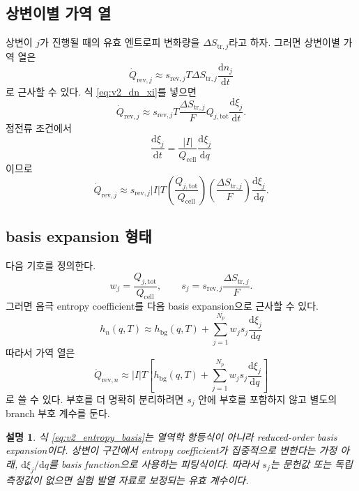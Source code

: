 \documentclass[11pt,a4paper]{article}
\newtheorem*{note}{설명}
\newcommand{\dd}{\mathrm{d}}
\newcommand{\tot}{\mathrm{tot}}
\newcommand{\bg}{\mathrm{bg}}
\newcommand{\cell}{\mathrm{cell}}
\begin{document}
\subsection{상변이별 가역 열}
상변이 \(j\)가 진행될 때의 유효 엔트로피 변화량을 \(\Delta S_{\mathrm{tr},j}\)라고 하자. 그러면 상변이별 가역 열은
\begin{equation}
\dot Q_{\mathrm{rev},j}\approx s_{\mathrm{rev},j}T\Delta S_{\mathrm{tr},j}\frac{\dd n_j}{\dd t}
\label{eq:v2_rev_j_dn}
\end{equation}
로 근사할 수 있다. 식 \eqref{eq:v2_dn_xi}를 넣으면
\begin{equation}
\dot Q_{\mathrm{rev},j}\approx s_{\mathrm{rev},j}T\frac{\Delta S_{\mathrm{tr},j}}{F}Q_{j,\tot}\frac{\dd\xi_j}{\dd t}.
\label{eq:v2_rev_j_dxi_dt}
\end{equation}
정전류 조건에서
\begin{equation}
\frac{\dd\xi_j}{\dd t}=\frac{|I|}{Q_{\cell}}\frac{\dd\xi_j}{\dd q}
\end{equation}
이므로
\begin{equation}
\dot Q_{\mathrm{rev},j}\approx s_{\mathrm{rev},j}|I|T\left(\frac{Q_{j,\tot}}{Q_{\cell}}\right)\left(\frac{\Delta S_{\mathrm{tr},j}}{F}\right)\frac{\dd\xi_j}{\dd q}.
\label{eq:v2_rev_j_final}
\end{equation}

\subsection{basis expansion 형태}
다음 기호를 정의한다.
\begin{equation}
w_j=\frac{Q_{j,\tot}}{Q_{\cell}},\qquad s_j=s_{\mathrm{rev},j}\frac{\Delta S_{\mathrm{tr},j}}{F}.
\label{eq:v2_w_s_def}
\end{equation}
그러면 음극 entropy coefficient를 다음 basis expansion으로 근사할 수 있다.
\begin{equation}
\boxed{
h_n(q,T)\approx h_{\bg}(q,T)+\sum_{j=1}^{N_p}w_js_j\frac{\dd\xi_j}{\dd q}
}
\label{eq:v2_entropy_basis}
\end{equation}
따라서 가역 열은
\begin{equation}
\boxed{
\dot Q_{\mathrm{rev},n}\approx |I|T\left[h_{\bg}(q,T)+\sum_{j=1}^{N_p}w_js_j\frac{\dd\xi_j}{\dd q}\right]
}
\label{eq:v2_rev_basis}
\end{equation}
로 쓸 수 있다. 부호를 더 명확히 분리하려면 \(s_j\) 안에 부호를 포함하지 않고 별도의 branch 부호 계수를 둔다.

\begin{note}
식 \eqref{eq:v2_entropy_basis}는 열역학 항등식이 아니라 reduced-order basis expansion이다. 상변이 구간에서 entropy coefficient가 집중적으로 변한다는 가정 아래, \(\dd\xi_j/\dd q\)를 basis function으로 사용하는 피팅식이다. 따라서 \(s_j\)는 문헌값 또는 독립 측정값이 없으면 실험 발열 자료로 보정되는 유효 계수이다.
\end{note}
\end{document}
